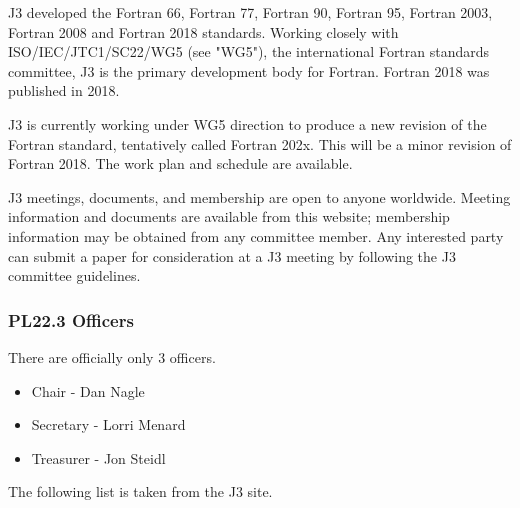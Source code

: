 \documentclass[10pt,letterpaper,twoside]{article}
\begin{document}
J3 developed the Fortran 66, Fortran 77, Fortran 90, Fortran 95, Fortran 
2003, Fortran 2008 and Fortran 2018 standards. Working closely with ISO/IEC/JTC1/SC22/WG5 
(see "WG5"), the international Fortran standards committee, J3 is 
the primary development body for Fortran. Fortran 2018 was published 
in 2018.

J3 is currently working under WG5 direction to produce a new revision 
of the Fortran standard, tentatively called Fortran 202x. This will 
be a minor revision of Fortran 2018. The work plan and schedule are 
available.

J3 meetings, documents, and membership are open to anyone worldwide. 
Meeting information and documents are available from this website; 
membership information may be obtained from any committee member. 
Any interested party can submit a paper for consideration at a J3 
meeting by following the J3 committee guidelines.

\subsubsection{PL22.3 Officers}

There are officially only 3 officers. 

\begin{itemize}

\item{Chair - Dan Nagle}

\item{Secretary - Lorri Menard}

\item{Treasurer - Jon Steidl}

\end{itemize}

The following list is taken from the J3 site.
\end{document}
